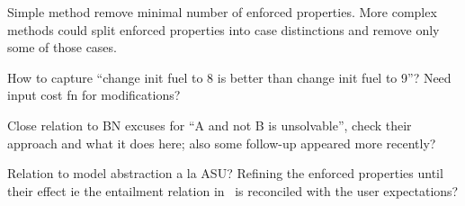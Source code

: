 Simple method remove minimal number of enforced properties. More
complex methods could split enforced properties into case distinctions
and remove only some of those cases.

How to capture ``change init fuel to 8 is better than change init fuel
to 9''? Need input cost fn for modifications?

Close relation to BN excuses for ``A and not B is unsolvable'', check
their approach and what it does here; also some follow-up appeared
more recently? 

Relation to model abstraction a la ASU? Refining the enforced
properties until their effect ie the entailment relation in \plans\ is
reconciled with the user expectations?

















